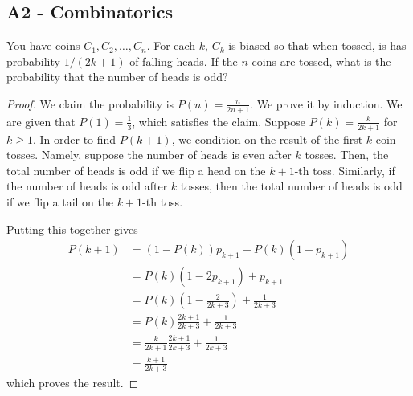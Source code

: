 \documentclass[11pt]{scrartcl}
\begin{document}
\subsection{A2 - Combinatorics}
\begin{Prob}[2001-A2] You have coins $C_1, C_2, \dots, C_n$.  For each $k$, $C_k$ is biased so that when tossed, is has probability $1/(2k+1)$ of falling heads.  If the $n$ coins are tossed, what is the probability that the number of heads is odd?
\end{Prob}
\begin{proof}
We claim the probability is $P(n) = \boxed{\frac{n}{2n+1}}$.  We prove it by induction.  We are given that $P(1) = \frac{1}{3}$, which satisfies the claim.  Suppose $P(k) = \frac{k}{2k+1}$ for $k \ge 1$.  In order to find $P(k+1)$, we condition on the result of the first $k$ coin tosses.  Namely, suppose the number of heads is even after $k$ tosses.  Then, the total number of heads is odd if we flip a head on the $k+1$-th toss.  Similarly, if the number of heads is odd after $k$ tosses, then the total number of heads is odd if we flip a tail on the $k+1$-th toss.  

Putting this together gives 
\begin{align*}
P(k+1) &= (1 - P(k))p_{k+1} + P(k)(1 - p_{k+1}) \\
&= P(k)\left (1 - 2p_{k+1}\right ) + p_{k+1} \\
&= P(k) \left (1 - \frac{2}{2k+3}\right ) + \frac{1}{2k+3} \\
&= P(k) \frac{2k+1}{2k+3} + \frac{1}{2k+3} \\
&= \frac{k}{2k+1} \frac{2k+1}{2k+3} + \frac{1}{2k+3} \\
&=\frac{k+1}{2k+3}
\end{align*}
which proves the result.
\end{proof}
\end{document}

